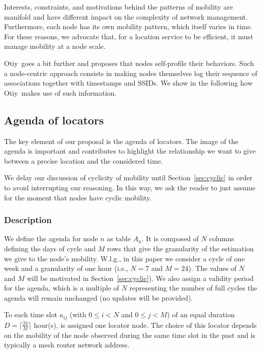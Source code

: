 \documentclass[a4paper]{sig-alternate-10pt}
\newcommand{\otiy}{{\sffamily Otiy}}
\begin{document}
Interests, constraints, and motivations behind the pat\-terns of
mobility are manifold and have different impact on the complexity of
network management. Further\-more, each node has its own mobility
pattern, which itself varies in time. For these reasons, we advo\-cate
that, for a location service to be efficient, it must manage
mobility at a node scale.

\otiy\ goes a bit further and proposes that nodes self-profile their
behaviors. Such a node-centric approach consists in making nodes
themselves log their sequence of associations together with
timestamps and SSIDs. We show in the following how \otiy\ makes use
of such information.


\subsection{Agenda of locators}
\label{subsec:agenda}

The key element of our proposal is the agenda of locators. The image
of the agenda is important and contributes to highlight the
relationship we want to give between a precise location and the
considered time.

We delay our discussion of cyclicity of mobility until
Section~\ref{sec:cyclic} in order to avoid interrupting our
reasoning. In this way, we ask the reader to just assume for the
moment that nodes have cyclic mobility.


\subsubsection{Description}
\label{subsubsec:description}

We define the agenda for node $n$ as table $A_{n}$. It is composed
of $N$ columns defining the days of cycle and $M$ rows that give the
granularity of the estimation we give to the node's mobility.
W.l.g., in this paper we consider a cycle of one week and a
granularity of one hour (i.e., $N=7$ and $M=24$). The values of $N$
and $M$ will be motivated in Section~\ref{sec:cyclic}). We also
assign a validity period for the agenda, which is a multiple of $N$
representing the number of full cycles the agenda will remain
unchanged (no updates will be provided).

To each time slot $a_{ij}$ (with $0 \leq i<N$ and $0\leq j<M$) of an
equal duration $D=\lceil\frac{24}{M}\rceil$ hour(s), is assigned one
locator node. The choice of this locator depends on the mobility of
the node observed during the same time slot in the past and is
typically a mesh router network address.
\end{document}
